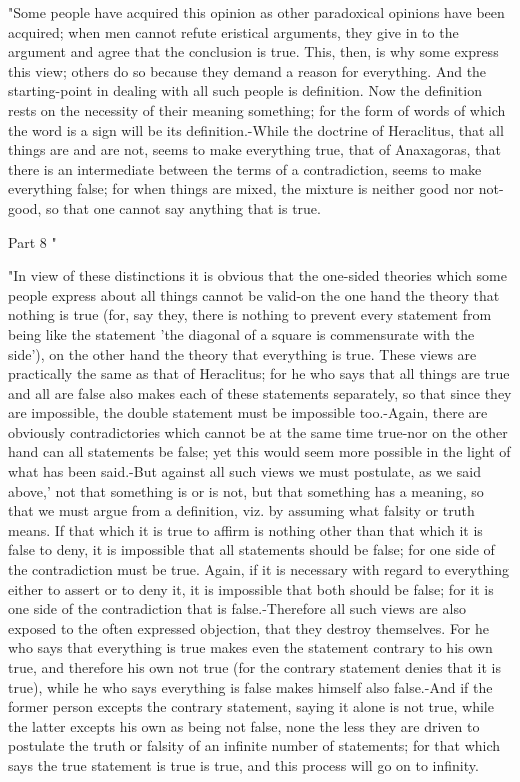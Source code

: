 "Some people have acquired this opinion as other paradoxical opinions
have been acquired; when men cannot refute eristical arguments, they
give in to the argument and agree that the conclusion is true. This,
then, is why some express this view; others do so because they demand
a reason for everything. And the starting-point in dealing with all
such people is definition. Now the definition rests on the necessity
of their meaning something; for the form of words of which the word
is a sign will be its definition.-While the doctrine of Heraclitus,
that all things are and are not, seems to make everything true, that
of Anaxagoras, that there is an intermediate between the terms of
a contradiction, seems to make everything false; for when things are
mixed, the mixture is neither good nor not-good, so that one cannot
say anything that is true. 

Part 8 "

"In view of these distinctions it is obvious that the one-sided theories
which some people express about all things cannot be valid-on the
one hand the theory that nothing is true (for, say they, there is
nothing to prevent every statement from being like the statement 'the
diagonal of a square is commensurate with the side'), on the other
hand the theory that everything is true. These views are practically
the same as that of Heraclitus; for he who says that all things are
true and all are false also makes each of these statements separately,
so that since they are impossible, the double statement must be impossible
too.-Again, there are obviously contradictories which cannot be at
the same time true-nor on the other hand can all statements be false;
yet this would seem more possible in the light of what has been said.-But
against all such views we must postulate, as we said above,' not that
something is or is not, but that something has a meaning, so that
we must argue from a definition, viz. by assuming what falsity or
truth means. If that which it is true to affirm is nothing other than
that which it is false to deny, it is impossible that all statements
should be false; for one side of the contradiction must be true. Again,
if it is necessary with regard to everything either to assert or to
deny it, it is impossible that both should be false; for it is one
side of the contradiction that is false.-Therefore all such views
are also exposed to the often expressed objection, that they destroy
themselves. For he who says that everything is true makes even the
statement contrary to his own true, and therefore his own not true
(for the contrary statement denies that it is true), while he who
says everything is false makes himself also false.-And if the former
person excepts the contrary statement, saying it alone is not true,
while the latter excepts his own as being not false, none the less
they are driven to postulate the truth or falsity of an infinite number
of statements; for that which says the true statement is true is true,
and this process will go on to infinity. 

